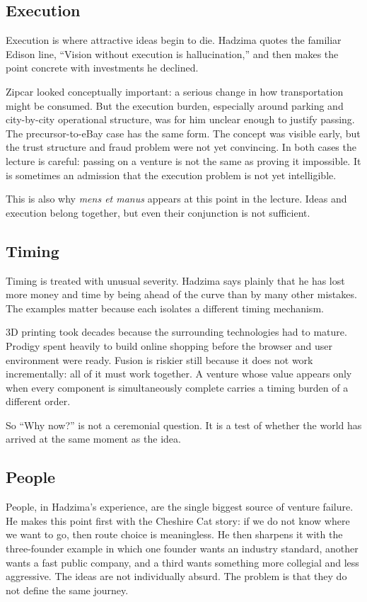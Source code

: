 \subsection{Execution}

Execution is where attractive ideas begin to die. Hadzima quotes the familiar Edison line, ``Vision without execution is hallucination,'' and then makes the point concrete with investments he declined.

Zipcar looked conceptually important: a serious change in how transportation might be consumed. But the execution burden, especially around parking and city-by-city operational structure, was for him unclear enough to justify passing. The precursor-to-eBay case has the same form. The concept was visible early, but the trust structure and fraud problem were not yet convincing. In both cases the lecture is careful: passing on a venture is not the same as proving it impossible. It is sometimes an admission that the execution problem is not yet intelligible.

This is also why \textit{mens et manus} appears at this point in the lecture. Ideas and execution belong together, but even their conjunction is not sufficient.

\subsection{Timing}

Timing is treated with unusual severity. Hadzima says plainly that he has lost more money and time by being ahead of the curve than by many other mistakes. The examples matter because each isolates a different timing mechanism.

3D printing took decades because the surrounding technologies had to mature. Prodigy spent heavily to build online shopping before the browser and user environment were ready. Fusion is riskier still because it does not work incrementally: all of it must work together. A venture whose value appears only when every component is simultaneously complete carries a timing burden of a different order.

So ``Why now?'' is not a ceremonial question. It is a test of whether the world has arrived at the same moment as the idea.

\subsection{People}

People, in Hadzima's experience, are the single biggest source of venture failure. He makes this point first with the Cheshire Cat story: if we do not know where we want to go, then route choice is meaningless. He then sharpens it with the three-founder example in which one founder wants an industry standard, another wants a fast public company, and a third wants something more collegial and less aggressive. The ideas are not individually absurd. The problem is that they do not define the same journey.

